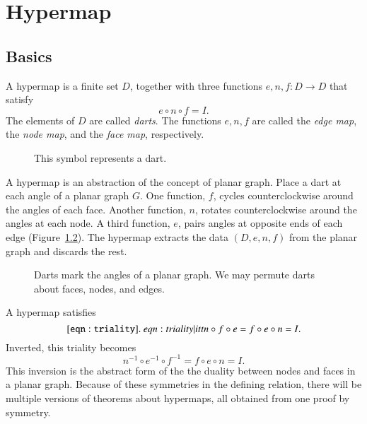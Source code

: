 
\chapter{Hypermap}\label{chap:hypermap}

\section{Basics}



\begin{definition}[hypermap]\label{def:hypermap}  A hypermap is a finite set $D$, together with
three functions $e,n,f:D\to D$ that satisfy
    $$e\circ n\circ f = I.$$
The elements of $D$ are called {\it darts}.  The functions $e,n,f$
are called the {\it edge map}, the {\it node map}, and the {\it
face map}, respectively.
\end{definition}


\begin{figure}[htb]
  \centering
  \caption{This symbol represents a dart.}
  \label{fig:dart}
\end{figure}

\begin{remark} A hypermap is an abstraction of
the concept of 
planar graph.  Place a dart at each angle of a planar graph $G$.
One function, $f$, 
cycles counterclockwise around the angles of each face.  
Another function, $n$, 
rotates counterclockwise around the angles at each
node.  A third function, $e$, pairs angles at opposite ends of
each edge  (Figure~\ref{fig:hypermap_ex}).   The hypermap extracts
the data $(D,e,n,f)$ from the planar graph and discards the rest.
\end{remark}

\begin{figure}[htb]
  \centering
  \caption{Darts mark the angles of a planar graph.  We may
  permute darts about faces, nodes, and edges.}
  \label{fig:hypermap_ex}
\end{figure}

A hypermap satisfies 
  \begin{equation}\tlabel{eqn:triality}
  n\circ f\circ e = f\circ e\circ n = I.
  \end{equation}
Inverted, this triality becomes
   $$
   n^{-1} \circ e^{-1} \circ f^{-1} = f \circ e \circ n = I.
   $$
This inversion
is the abstract form of the
the duality between nodes and faces in a planar graph.  
Because of
these symmetries in the defining relation, 
there will be multiple versions of 
theorems about hypermaps,
all obtained from one proof by symmetry.

